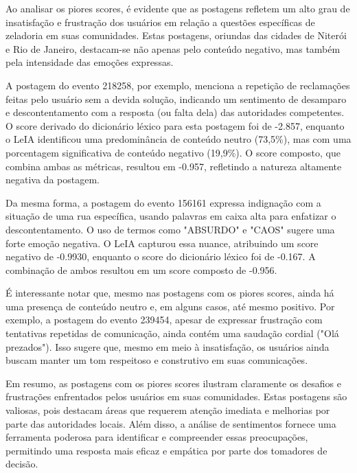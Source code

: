Ao analisar os piores scores, é evidente que as postagens refletem um alto grau de insatisfação e frustração dos usuários em relação a questões específicas de zeladoria em suas comunidades. Estas postagens, oriundas das cidades de Niterói e Rio de Janeiro, destacam-se não apenas pelo conteúdo negativo, mas também pela intensidade das emoções expressas.

A postagem do evento 218258, por exemplo, menciona a repetição de reclamações feitas pelo usuário sem a devida solução, indicando um sentimento de desamparo e descontentamento com a resposta (ou falta dela) das autoridades competentes. O score derivado do dicionário léxico para esta postagem foi de -2.857, enquanto o LeIA identificou uma predominância de conteúdo neutro (73,5\%), mas com uma porcentagem significativa de conteúdo negativo (19,9\%). O score composto, que combina ambas as métricas, resultou em -0.957, refletindo a natureza altamente negativa da postagem.

Da mesma forma, a postagem do evento 156161 expressa indignação com a situação de uma rua específica, usando palavras em caixa alta para enfatizar o descontentamento. O uso de termos como "ABSURDO" e "CAOS" sugere uma forte emoção negativa. O LeIA capturou essa nuance, atribuindo um score negativo de -0.9930, enquanto o score do dicionário léxico foi de -0.167. A combinação de ambos resultou em um score composto de -0.956.

É interessante notar que, mesmo nas postagens com os piores scores, ainda há uma presença de conteúdo neutro e, em alguns casos, até mesmo positivo. Por exemplo, a postagem do evento 239454, apesar de expressar frustração com tentativas repetidas de comunicação, ainda contém uma saudação cordial ("Olá prezados"). Isso sugere que, mesmo em meio à insatisfação, os usuários ainda buscam manter um tom respeitoso e construtivo em suas comunicações.

Em resumo, as postagens com os piores scores ilustram claramente os desafios e frustrações enfrentados pelos usuários em suas comunidades. Estas postagens são valiosas, pois destacam áreas que requerem atenção imediata e melhorias por parte das autoridades locais. Além disso, a análise de sentimentos fornece uma ferramenta poderosa para identificar e compreender essas preocupações, permitindo uma resposta mais eficaz e empática por parte dos tomadores de decisão.

